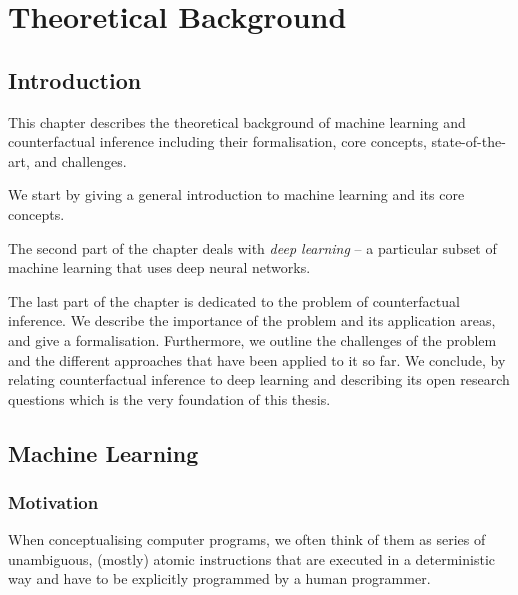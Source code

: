 %

\chapter{\label{ch:2-background}Theoretical Background} 


\section{Introduction}
This chapter describes the theoretical background of machine learning and counterfactual inference including their formalisation, core concepts, state-of-the-art, and challenges. 

We start by giving a general introduction to machine learning and  its core concepts. 

The second part of the chapter deals with  \emph{deep learning} -- a particular subset of machine learning that uses deep neural networks. 

The last part of the chapter is dedicated to the problem of counterfactual inference. We describe the importance of the problem and its application areas, and give a formalisation. Furthermore, we outline the challenges of the problem and the different approaches that have been applied to it so far. We conclude, by relating counterfactual inference to deep learning and describing its open research questions which is the very foundation of this thesis. 



\section{Machine Learning}


\subsection{Motivation}
When conceptualising computer programs, we often think of them as series of unambiguous, (mostly) atomic instructions that are executed in a deterministic way and have to be explicitly programmed by a human programmer. 

